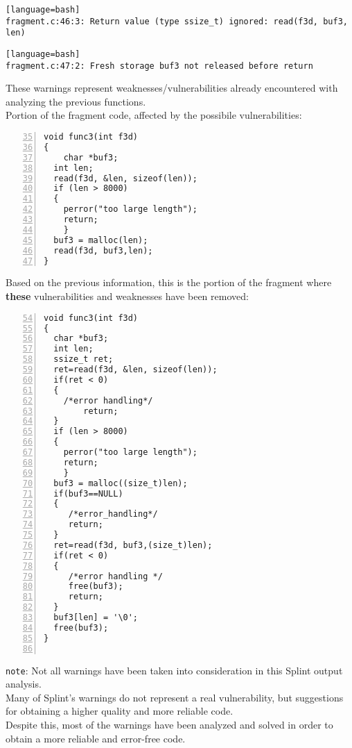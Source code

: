 \documentclass[a4paper,12pt]{article}
\newenvironment{SpecialPar}
  {\begin{shaded}}
  {\end{shaded}}
\begin{document}
\begin{lstlisting}[style=DOS][language=bash]
fragment.c:46:3: Return value (type ssize_t) ignored: read(f3d, buf3, len)
\end{lstlisting}


\begin{lstlisting}[style=DOS][language=bash]
fragment.c:47:2: Fresh storage buf3 not released before return
\end{lstlisting}
These warnings represent weaknesses/vulnerabilities already encountered with analyzing the previous functions.\\
Portion of the fragment code, affected by the possibile vulnerabilities:
\begin{lstlisting}[style=c,numbers=left,firstnumber=35,linebackgroundcolor={
\ifnum\value{lstnumber}=39\color{red}\fi
\ifnum\value{lstnumber}=46\color{red}\fi
\ifnum\value{lstnumber}=47\color{red}\fi
}]
void func3(int f3d)
{
	char *buf3;
  int len;
  read(f3d, &len, sizeof(len));
  if (len > 8000) 
  { 
  	perror("too large length");
  	return; 
	}
  buf3 = malloc(len);
  read(f3d, buf3,len);        
}
\end{lstlisting}


\newpage
\noindent
Based on the previous information, this is the portion of the fragment where \textbf{these} vulnerabilities and weaknesses have been removed:
\begin{lstlisting}[style=c,numbers=left,firstnumber=54,linebackgroundcolor={
\ifnum\value{lstnumber}=59\color{green}\fi
\ifnum\value{lstnumber}=71\color{green}\fi
\ifnum\value{lstnumber}=76\color{green}\fi
\ifnum\value{lstnumber}=80\color{green}\fi
\ifnum\value{lstnumber}=83\color{green}\fi}]
void func3(int f3d)
{
  char *buf3;
  int len;
  ssize_t ret;
  ret=read(f3d, &len, sizeof(len));
  if(ret < 0)
  {
    /*error handling*/
		return;
  }
  if (len > 8000) 
  { 
  	perror("too large length");
  	return; 
	}
  buf3 = malloc((size_t)len);
  if(buf3==NULL)
  {
     /*error_handling*/
     return;
  }
  ret=read(f3d, buf3,(size_t)len);
  if(ret < 0)
  {
     /*error handling */
     free(buf3);
     return;
  }
  buf3[len] = '\0';
  free(buf3);        
}


\end{lstlisting}

\begin{SpecialPar}
\noindent
\texttt{note}: Not all warnings have been taken into consideration in this Splint output analysis.\\
Many of Splint's warnings do not represent a real vulnerability, but suggestions for obtaining a higher quality and more reliable code.\\
Despite this, most of the warnings have been analyzed and solved in order to obtain a more reliable and error-free code.
\end{SpecialPar}
\end{document}
